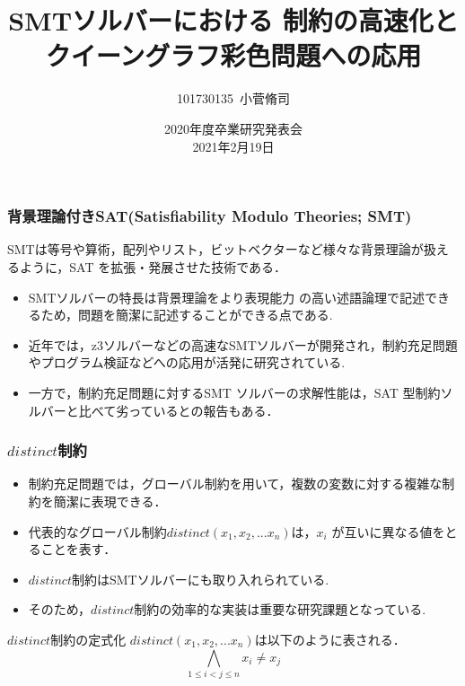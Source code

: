 \documentclass [dvipdfmx,11pt]{beamer}
\title[]{SMTソルバーにおける \distinct 制約の高速化とクイーングラフ彩色問題への応用}
\author{101730135~小菅脩司}
\institute{番原研究室}
\date{2020年度卒業研究発表会\\2021年2月19日}
\newcommand{\distinct}{$distinct$}
\begin{document}
\begin{frame} {}
    \titlepage
\end{frame}



\begin{frame}
    \frametitle{背景理論付きSAT(Satisfiability Modulo Theories; SMT)}
    \begin{alertblock}{}
    SMTは等号や算術，配列やリスト，ビットベクターなど様々な背景理論が扱えるように，SAT を拡張・発展させた技術である．
    \end{alertblock}
    \begin{itemize}
        \item SMTソルバーの特長は背景理論をより表現能力 の高い述語論理で記述できるため，問題を簡潔に記述することができる点である.
        \item 近年では，z3ソルバーなどの高速なSMTソルバーが開発され，制約充足問題やプログラム検証などへの応用が活発に研究されている.
        \item 一方で，制約充足問題に対するSMT ソルバーの求解性能は，SAT 型制約ソルバーと比べて劣っているとの報告もある．
    \end{itemize}

\end{frame}



\begin{frame}
    \frametitle{\distinct 制約}
    \begin{itemize}
        \item 制約充足問題では，グローバル制約を用いて，複数の変数に対する複雑な制約を簡潔に表現できる．
        \item 代表的なグローバル制約$distinct(x_1,x_2,...x_n)$は，$x_i$ が互いに異なる値をとることを表す．
        \item \distinct 制約はSMTソルバーにも取り入れられている.
        \item そのため，\distinct 制約の効率的な実装は重要な研究課題となっている.
    \end{itemize}
    \begin{block}{\distinct 制約の定式化}
        $distinct(x_1,x_2,...x_n)$は以下のように表される．\\
        $$\bigwedge_{1 \leq i < j \leq n} x_i \neq x_j$$
    \end{block}
\end{frame}
\end{document}
